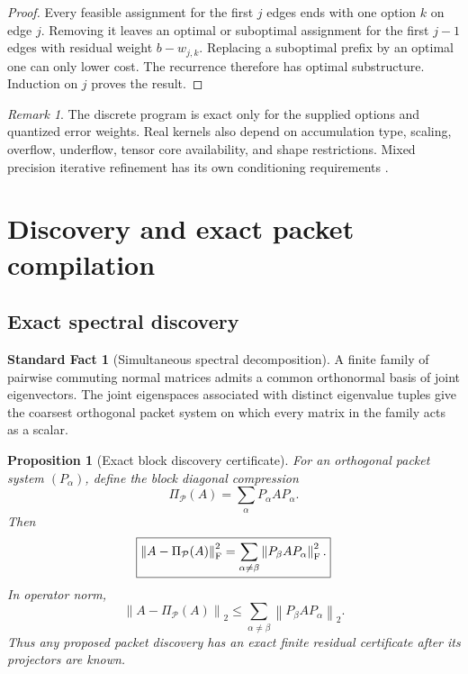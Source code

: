 \documentclass{aomart}
\newtheorem{proposition}[proposition]{Proposition}
\theoremstyle{definition}
\newtheorem{standardfact}[standardfact]{Standard Fact}
\theoremstyle{remark}
\newtheorem{remark}[remark]{Remark}
\newcommand{\Pcal}{\mathcal P}
\newcommand{\norm}[1]{\left\lVert#1\right\rVert}
\begin{document}
\begin{proof}
Every feasible assignment for the first \(j\) edges ends with one option \(k\) on edge \(j\). Removing it leaves an optimal or suboptimal assignment for the first \(j-1\) edges with residual weight \(b-w_{j,k}\). Replacing a suboptimal prefix by an optimal one can only lower cost. The recurrence therefore has optimal substructure. Induction on \(j\) proves the result.
\end{proof}

\begin{remark}\label{rem:dtype_boundary}
The discrete program is exact only for the supplied options and quantized error weights. Real kernels also depend on accumulation type, scaling, overflow, underflow, tensor core availability, and shape restrictions. Mixed precision iterative refinement has its own conditioning requirements \cite{CarsonHigham2018}.
\end{remark}

\section{Discovery and exact packet compilation}\label{sec:compiler}

\subsection{Exact spectral discovery}

\begin{standardfact}[Simultaneous spectral decomposition]\label{fact:simultaneous}
A finite family of pairwise commuting normal matrices admits a common orthonormal basis of joint eigenvectors. The joint eigenspaces associated with distinct eigenvalue tuples give the coarsest orthogonal packet system on which every matrix in the family acts as a scalar.
\end{standardfact}

\begin{proposition}[Exact block discovery certificate]\label{prop:block_discovery_certificate}
For an orthogonal packet system \((P_\alpha)\), define the block diagonal compression
\[
\Pi_{\Pcal}(A)
=
\sum_\alpha P_\alpha AP_\alpha.
\]
Then
\[
\boxed{
\norm{A-\Pi_{\Pcal}(A)}_{\rm F}^2
=
\sum_{\alpha\neq\beta}
\norm{P_\beta AP_\alpha}_{\rm F}^2.
}
\]
In operator norm,
\[
\boxed{
\norm{A-\Pi_{\Pcal}(A)}_2
\leq
\sum_{\alpha\neq\beta}
\norm{P_\beta AP_\alpha}_2.
}
\]
Thus any proposed packet discovery has an exact finite residual certificate after its projectors are known.
\end{proposition}
\end{document}
